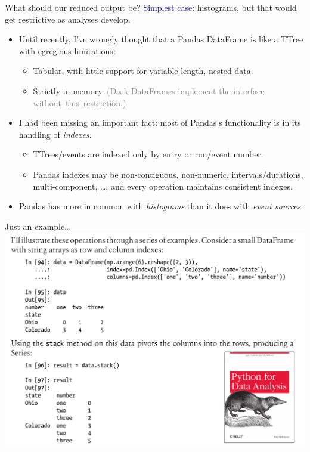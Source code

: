 \documentclass[aspectratio=169]{beamer}
\begin{document}
\begin{frame}{What should our reduced output be?}
\vspace{0.5 cm}
\textcolor{darkblue}{Simplest case:} histograms, but that would get restrictive as analyses develop.

\vspace{0.25 cm}

\vspace{0.5 cm}
\begin{itemize}\setlength{\itemsep}{0.25 cm}
\item<3-> Until recently, I've wrongly thought that a Pandas DataFrame is like a TTree with egregious limitations:
\begin{itemize}
\item Tabular, with little support for variable-length, nested data.
\item Strictly in-memory. \textcolor{gray}{(Dask DataFrames implement the interface \mbox{without this restriction.)\hspace{-1 cm}}}
\end{itemize}
\item<4-> I had been missing an important fact: most of Pandas's functionality is in its handling of {\it indexes}.
\begin{itemize}
\item TTrees/events are indexed only by entry or run/event number.
\item Pandas indexes may be non-contiguous, non-numeric, intervals/durations, multi-component, \ldots, and every operation maintains consistent indexes.
\end{itemize}
\item<5-> Pandas has more in common with {\it histograms} than it does with {\it event sources.}
\end{itemize}
\end{frame}

\begin{frame}{Just an example\ldots}
\vspace{0.25 cm}
\mbox{ } \hfill \includegraphics[width=0.78\linewidth]{pandas-book.png} \hfill \mbox{ }
\end{frame}
\end{document}
